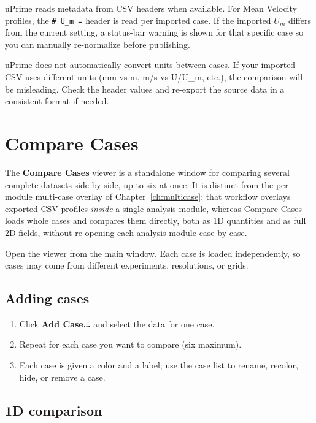 \documentclass[11pt, a4paper]{report}
\newcommand{\uipth}[1]{\textbf{\textcolor{upblue}{#1}}}
\newcommand{\software}[1]{\textsf{#1}}
\begin{document}
\software{uPrime} reads metadata from CSV headers when available. For Mean Velocity profiles, the \texttt{\# U\_m =} header is read per imported case. If the imported $U_m$ differs from the current setting, a status-bar warning is shown for that specific case so you can manually re-normalize before publishing.

\begin{warnbox}
\software{uPrime} does not automatically convert units between cases. If your imported CSV uses different units (mm vs m, m/s vs U/U\_m, etc.), the comparison will be misleading. Check the header values and re-export the source data in a consistent format if needed.
\end{warnbox}

\chapter{Compare Cases}
\label{ch:comparecases}

The \uipth{Compare Cases} viewer is a standalone window for comparing several complete datasets side by side, up to six at once. It is distinct from the per-module multi-case overlay of Chapter~\ref{ch:multicase}: that workflow overlays exported CSV profiles \emph{inside} a single analysis module, whereas Compare Cases loads whole cases and compares them directly, both as 1D quantities and as full 2D fields, without re-opening each analysis module case by case.

Open the viewer from the main window. Each case is loaded independently, so cases may come from different experiments, resolutions, or grids.

\section{Adding cases}

\begin{stepbox}
\begin{enumerate}[leftmargin=1.5em, topsep=2pt]
  \item Click \uipth{Add Case\ldots} and select the data for one case.
  \item Repeat for each case you want to compare (six maximum).
  \item Each case is given a color and a label; use the case list to rename, recolor, hide, or remove a case.
\end{enumerate}
\end{stepbox}

\section{1D comparison}
\end{document}
